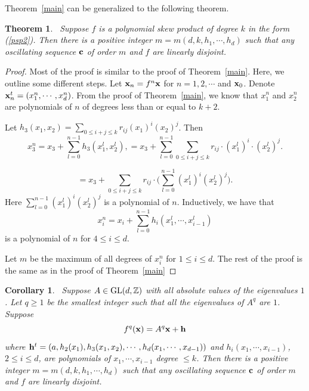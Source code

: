 \documentclass[12pt,letterpaper]{amsart}
\newtheorem {theorem}{Theorem}
\newtheorem {corollary}{Corollary}
\newcommand {\Z} {{\mathbb Z}}
\begin{document}
Theorem~\ref{main} can be generalized to the following theorem.
 
\medskip
\begin{theorem}~\label{main2}
Suppose $f$ is a polynomial skew product of degree $k$ in the form (\ref{psp2}). 
Then there is a positive integer $m=m(d, k, h_{1}, \cdots, h_{d})$ such that any oscillating sequence ${\bf c}$ of order $m$ and $f$ are linearly disjoint. 
\end{theorem}

\begin{proof}
Most of the proof is similar to the proof of Theorem~\ref{main}. Here, we outline some different steps. Let ${\bf x}_{n}=f^{n}{\bf x}$ for $n=1, 2, \cdots$ and ${\bf x}_{0}$.
Denote ${\bf x}_{n}^{t}=(x_{1}^{n},\cdots, x_{d}^{n})$. From the proof of Theorem~\ref{main}, we know that $x_{1}^{n}$ and $x_{2}^{n}$ are polynomials of $n$ of degrees less than or equal to $k+2$. 

Let $h_{3} (x_{1}, x_{2}) = \sum_{0\leq i+j\leq k} r_{ij} (x_{1})^{i}(x_{2})^{j}$. Then 
$$
x_{3}^{n} = x_{3} +\sum_{l=0}^{n-1} h_{3} (x_{1}^{l}, x_{2}^{l}),
=x_{3} +\sum_{l=0}^{n-1} \sum_{0\leq i+j\leq k} r_{ij} \cdot (x_{1}^{l})^{i} \cdot (x_{2}^{l})^{j}.
$$

$$
=x_{3} +\sum_{0\leq i+j\leq k}r_{ij} \cdot \Big(\sum_{l=0}^{n-1}  (x_{1}^{l})^{i} (x_{2}^{l})^{j}\Big).
$$
Here $\sum_{l=0}^{n-1}  (x_{1}^{l})^{i} (x_{2}^{l})^{j}$ is a polynomial of $n$. 
Inductively, we have that  
$$
x_{i}^{n} = x_{i} + \sum_{l=0}^{n-1} h_{i}(x_{1}^{l}, \cdots, x_{i-1}^{l})
$$
is a polynomial of $n$ for $4\leq i\leq d$. 

Let $m$ be the maximum of all degrees of $x_{i}^{n}$ for $1\leq i\leq d$. 
The rest of the proof is the same as in the proof of Theorem~\ref{main}

\end{proof}

\medskip
\begin{corollary}~\label{maincg}
Suppose $A\in \hbox{GL}(d,\Z)$ with all absolute values of the eigenvalues $1$. Let $q\geq 1$ be the smallest integer such that all the eigenvalues of $A^{q}$ are $1$. Suppose 
$$
f^{q}({\bf x}) =A^{q}{\bf x} +{\bf h} 
$$
where 
${\bf h}^{t} =(a, h_{2} (x_{1}), h_{3}(x_{1}, x_{2}), \cdots, h_{d}(x_{1}, \cdots, x_{d-1}))$ and $h_{i}(x_{1}, \cdots, x_{i-1})$, $2\leq i\leq d$, are polynomials of $x_{1}, \cdots, x_{i-1}$ degree $\leq k$. 
Then there is a positive integer $m=m(d, k, h_{1}, \cdots, h_{d})$ such that any oscillating sequence ${\bf c}$ of order $m$ and $f$ are linearly disjoint. 
\end{corollary}
\end{document}
